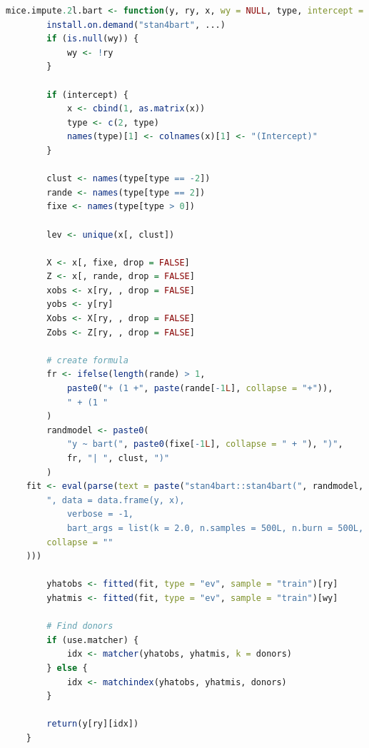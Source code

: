 \documentclass[10pt, a4paper, titlepage]{article}
\begin{document}
\begin{lstlisting}[language=R, caption={Imputation function for multilevel BART with random effects and cross-level interactions}, label={lst:multilevelBART}]
    mice.impute.2l.bart <- function(y, ry, x, wy = NULL, type, intercept = TRUE, use.matcher = FALSE, donors = 5L, ...) {
        install.on.demand("stan4bart", ...)
        if (is.null(wy)) {
            wy <- !ry
        }
    
        if (intercept) {
            x <- cbind(1, as.matrix(x))
            type <- c(2, type)
            names(type)[1] <- colnames(x)[1] <- "(Intercept)"
        }
    
        clust <- names(type[type == -2])
        rande <- names(type[type == 2])
        fixe <- names(type[type > 0])
    
        lev <- unique(x[, clust])
    
        X <- x[, fixe, drop = FALSE]
        Z <- x[, rande, drop = FALSE]
        xobs <- x[ry, , drop = FALSE]
        yobs <- y[ry]
        Xobs <- X[ry, , drop = FALSE]
        Zobs <- Z[ry, , drop = FALSE]
    
        # create formula
        fr <- ifelse(length(rande) > 1,
            paste0("+ (1 +", paste(rande[-1L], collapse = "+")),
            " + (1 "
        )
        randmodel <- paste0(
            "y ~ bart(", paste0(fixe[-1L], collapse = " + "), ")",
            fr, "| ", clust, ")"
        )
    fit <- eval(parse(text = paste("stan4bart::stan4bart(", randmodel,
        ", data = data.frame(y, x),
            verbose = -1,
            bart_args = list(k = 2.0, n.samples = 500L, n.burn = 500L, n.thin = 1L, n.threads = 1))",
        collapse = ""
    )))
    
        yhatobs <- fitted(fit, type = "ev", sample = "train")[ry]
        yhatmis <- fitted(fit, type = "ev", sample = "train")[wy]
    
        # Find donors
        if (use.matcher) {
            idx <- matcher(yhatobs, yhatmis, k = donors)
        } else {
            idx <- matchindex(yhatobs, yhatmis, donors)
        }
    
        return(y[ry][idx])
    }
\end{lstlisting}

\newpage


\end{document}
